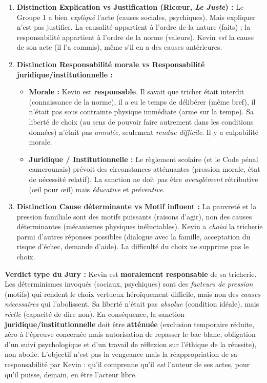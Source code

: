 \documentclass[11pt]{article}
\newcommand{\cle}[1]{{\popxbold\color{popdark}#1}}
\begin{document}
\begin{exoresolu}
\begin{enumerate}
    \item \textbf{Distinction \cle{Explication} vs \cle{Justification} (Ricœur, \emph{Le Juste}) :}
    Le Groupe 1 a bien \emph{expliqué} l'acte (causes sociales, psychiques). Mais expliquer n'est pas justifier. La causalité appartient à l'ordre de la \cle{nature} (faits) ; la responsabilité appartient à l'ordre de la \cle{norme} (valeurs). Kevin \emph{est} la cause de son acte (il l'a commis), même s'il en a des causes antérieures.
    \item \textbf{Distinction \cle{Responsabilité morale} vs \cle{Responsabilité juridique/institutionnelle} :}
    \begin{itemize}
        \item \textbf{Morale :} Kevin est \textbf{responsable}. Il savait que tricher était interdit (connaissance de la norme), il a eu le temps de délibérer (même bref), il n'était pas sous contrainte physique immédiate (arme sur la tempe). Sa \cle{liberté de choix} (au sens de \cle{pouvoir faire autrement} dans les conditions données) n'était pas \emph{annulée}, seulement \emph{rendue difficile}. Il y a \cle{culpabilité} morale.
        \item \textbf{Juridique / Institutionnelle :} Le règlement scolaire (et le Code pénal camerounais) prévoit des \cle{circonstances atténuantes} (pression morale, état de nécessité relatif). La sanction ne doit pas être \emph{aveuglément} rétributive (œil pour œil) mais \emph{éducative} et \emph{préventive}.
    \end{itemize}
    \item \textbf{Distinction \cle{Cause déterminante} vs \cle{Motif influent} :}
    La pauvreté et la pression familiale sont des \cle{motifs} puissants (raisons d'agir), non des \cle{causes déterminantes} (mécanismes physiques inéluctables). Kevin a \emph{choisi} la tricherie parmi d'autres réponses possibles (dialogue avec la famille, acceptation du risque d'échec, demande d'aide). La difficulté du choix ne supprime pas le choix.
\end{enumerate}

\textbf{Verdict type du Jury :}
\guillemotleft Kevin est \textbf{moralement responsable} de sa tricherie. Les déterminismes invoqués (sociaux, psychiques) sont des \emph{facteurs de pression} (motifs) qui rendent le choix vertueux héroïquement difficile, mais non des \emph{causes nécessaires} qui l'abolissent. Sa liberté n'était pas \emph{absolue} (condition idéale), mais \emph{réelle} (capacité de dire non).
En conséquence, la sanction \textbf{juridique/institutionnelle} doit être \textbf{atténuée} (exclusion temporaire réduite, zéro à l'épreuve concernée mais autorisation de repasser le bac blanc, obligation d'un suivi psychologique et d'un travail de réflexion sur l'éthique de la réussite), non abolie. L'objectif n'est pas la vengeance mais la \cle{réappropriation de sa responsabilité} par Kevin : qu'il comprenne qu'il \emph{est} l'auteur de ses actes, pour qu'il puisse, demain, en être l'acteur libre. \guillemotright


\end{exoresolu}
\end{document}
